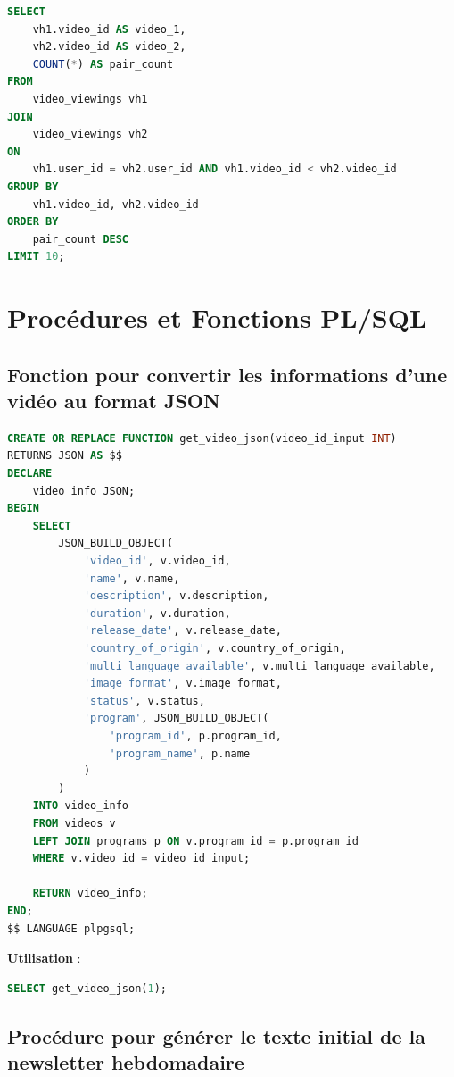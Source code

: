 \documentclass{article}
\begin{document}
\begin{lstlisting}[language=SQL]
SELECT 
    vh1.video_id AS video_1,
    vh2.video_id AS video_2,
    COUNT(*) AS pair_count
FROM 
    video_viewings vh1
JOIN 
    video_viewings vh2 
ON 
    vh1.user_id = vh2.user_id AND vh1.video_id < vh2.video_id
GROUP BY 
    vh1.video_id, vh2.video_id
ORDER BY 
    pair_count DESC
LIMIT 10;
\end{lstlisting}

\section{Procédures et Fonctions PL/SQL}

\subsection{Fonction pour convertir les informations d'une vidéo au format JSON}

\begin{lstlisting}[language=SQL]
CREATE OR REPLACE FUNCTION get_video_json(video_id_input INT)
RETURNS JSON AS $$
DECLARE
    video_info JSON;
BEGIN
    SELECT 
        JSON_BUILD_OBJECT(
            'video_id', v.video_id,
            'name', v.name,
            'description', v.description,
            'duration', v.duration,
            'release_date', v.release_date,
            'country_of_origin', v.country_of_origin,
            'multi_language_available', v.multi_language_available,
            'image_format', v.image_format,
            'status', v.status,
            'program', JSON_BUILD_OBJECT(
                'program_id', p.program_id,
                'program_name', p.name
            )
        )
    INTO video_info
    FROM videos v
    LEFT JOIN programs p ON v.program_id = p.program_id
    WHERE v.video_id = video_id_input;

    RETURN video_info;
END;
$$ LANGUAGE plpgsql;
\end{lstlisting}

\textbf{Utilisation} :

\begin{lstlisting}[language=SQL]
SELECT get_video_json(1);
\end{lstlisting}

\subsection{Procédure pour générer le texte initial de la newsletter hebdomadaire}
\end{document}
